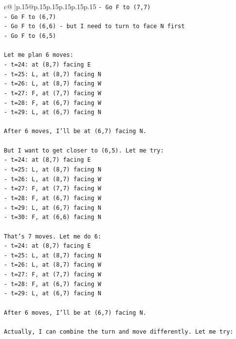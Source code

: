 \documentclass{article}
\begin{document}
{\begin{supertabular}{c@{$\;$}|p{.15\linewidth}@{}p{.15\linewidth}p{.15\linewidth}p{.15\linewidth}p{.15\linewidth}p{.15\linewidth}}
{{{\texttt{{-} Go F to (7,7)} \\
\texttt{{-} Go F to (6,7)} \\
\texttt{{-} Go F to (6,6) {-} but I need to turn to face N first} \\
\texttt{{-} Go F to (6,5)} \\
\\ 
\texttt{Let me plan 6 moves:} \\
\texttt{{-} t=24: at (8,7) facing E} \\
\texttt{{-} t=25: L, at (8,7) facing N} \\
\texttt{{-} t=26: L, at (8,7) facing W} \\
\texttt{{-} t=27: F, at (7,7) facing W} \\
\texttt{{-} t=28: F, at (6,7) facing W} \\
\texttt{{-} t=29: L, at (6,7) facing N} \\
\\ 
\texttt{After 6 moves, I'll be at (6,7) facing N.} \\
\\ 
\texttt{But I want to get closer to (6,5). Let me try:} \\
\texttt{{-} t=24: at (8,7) facing E} \\
\texttt{{-} t=25: L, at (8,7) facing N} \\
\texttt{{-} t=26: L, at (8,7) facing W} \\
\texttt{{-} t=27: F, at (7,7) facing W} \\
\texttt{{-} t=28: F, at (6,7) facing W} \\
\texttt{{-} t=29: L, at (6,7) facing N} \\
\texttt{{-} t=30: F, at (6,6) facing N} \\
\\ 
\texttt{That's 7 moves. Let me do 6:} \\
\texttt{{-} t=24: at (8,7) facing E} \\
\texttt{{-} t=25: L, at (8,7) facing N} \\
\texttt{{-} t=26: L, at (8,7) facing W} \\
\texttt{{-} t=27: F, at (7,7) facing W} \\
\texttt{{-} t=28: F, at (6,7) facing W} \\
\texttt{{-} t=29: L, at (6,7) facing N} \\
\\ 
\texttt{After 6 moves, I'll be at (6,7) facing N.} \\
\\ 
\texttt{Actually, I can combine the turn and move differently. Let me try:} \\
}}}
\end{supertabular}}
\end{document}
